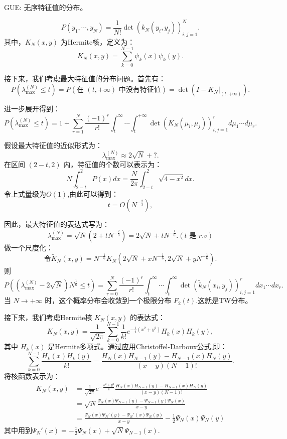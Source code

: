 GUE: 无序特征值的分布。

\[
P(y_{1},\cdots,y_{N}) = \frac{1}{N!} \det(k_{N}(y_{i}, y_{j}))_{i,j=1}^{N}.
\]
其中，\( K_{N}(x, y) \) 为Hermite核，定义为：
\[
K_{N}(x,y) = \sum_{k=0}^{N-1} \psi_{k}(x) \psi_{k}(y).
\]

接下来，我们考虑最大特征值的分布问题。首先有：
\[
P(\lambda_{\max}^{(N)} \leq t) = P(\text{在 }(t, +\infty)\text{ 中没有特征值})= \det(I - K_{N}|_{(t,+\infty)}).
\]

进一步展开得到：
\[
P(\lambda_{\max}^{(N)} \leq t) = 1 + \sum_{r=1}^{N} \frac{(-1)^r}{r!} \int_{t}^{\infty} \cdots \int_{t}^{+\infty} \det(K_{N}(\mu_{i}, \mu_{j}))_{i,j=1}^{r} d\mu_{1} \cdots d\mu_{r}.
\]

假设最大特征值的近似形式为：
\[
\lambda_{\max}^{(N)} \approx 2\sqrt{N} + ?.
\]
在区间 \( (2-t, 2) \) 内，特征值的个数可以表示为：
\[
N \int_{2-t}^{2} P(x) dx = \frac{N}{2\pi} \int_{2-t}^{2} \sqrt{4 - x^2} dx.
\]
令上式量级为$O(1)$,由此可以得到：
\[
t = O(N^{-\frac{2}{3}}),
\]

因此，最大特征值的表达式写为：
\[
\lambda_{\max}^{(N)} = \sqrt{N} \left( 2 + t N^{-\frac{2}{3}} \right) = 2\sqrt{N} + t N^{-\frac{1}{6}}.
(t\text{ 是 }r.v)\]
做一个尺度化：
\[
\text{令}\tilde{K}_{N}(x, y) = N^{-\frac{1}{6}} K_N(2\sqrt{N} + x N^{-\frac{1}{6}}, 2\sqrt{N} + y N^{-\frac{1}{6}}).
\]
则
\[
P\left( \left(\lambda_{\max}^{(N)} - 2\sqrt{N}\right) N^{\frac{1}{6}} \leq t \right) = \sum_{r=0}^{N} \frac{(-1)^r}{r!} \int_{t}^{\infty} \cdots \int_{t}^{\infty} \det(\tilde{k}_{N}(x_{i}, y_{j}))_{i,j=1}^{r} dx_{1} \cdots dx_{r}.
\]
当 \( N \to +\infty \) 时，这个概率分布会收敛到一个极限分布 \( F_{2}(t) \).这就是TW分布。

接下来，我们考虑Hermite核 \( K_{N}(x, y) \) 的表达式：
\[
K_{N}(x, y) = \frac{1}{\sqrt{2\pi}} \sum_{k=0}^{N-1} \frac{1}{k!} e^{-\frac{1}{4}(x^2 + y^2)} H_k(x) H_k(y),
\]
其中 \( H_k(x) \) 是Hermite多项式。通过应用Christoffel-Darboux公式,即：
\[
\sum_{k=0}^{N-1} \frac{H_k(x) H_k(y)}{k!} = \frac{H_N(x) H_{N-1}(y) - H_{N-1}(x) H_N(y)}{(x - y)(N - 1)!}.
\]
将核函数表示为：
\begin{equation*}
    \begin{aligned}
        K_{N}(x, y) &= \frac{1}{\sqrt{2\pi}} e^{-\frac{x^2 + y^2}{4}} \frac{H_N(x) H_{N-1}(y) - H_{N-1}(x) H_N(y)}{(x - y)(N - 1)!}\\
        &=\sqrt{N}\frac{\Psi_{N}(x)\Psi_{N-1}(y)-\Psi_{N-1}(y)\Psi_{N}(x)}{x-y}\\
        &=\frac{\Psi_N(x)\Psi_N'(y) - \Psi_N'(x)\Psi_N(y)}{x-y} - \frac{1}{2}\Psi_{N}(x)\Psi_{N}(y) 
    \end{aligned}
\end{equation*}
其中用到$\Psi_{N}'(x)=-\frac{x}{2}\Psi_{N}(x) + \sqrt{N}\Psi_{N-1}(x)$.

